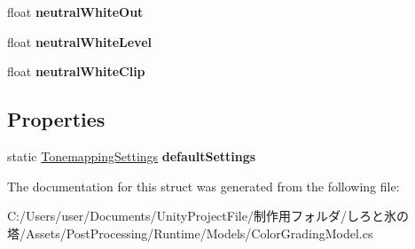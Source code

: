\begin{DoxyCompactItemize}
float {\bfseries neutral\+White\+Out}
\item 
\mbox{\label{struct_unity_engine_1_1_post_processing_1_1_color_grading_model_1_1_tonemapping_settings_a4f2e937233ddb0d540977b2ea1748137}} 
float {\bfseries neutral\+White\+Level}
\item 
\mbox{\label{struct_unity_engine_1_1_post_processing_1_1_color_grading_model_1_1_tonemapping_settings_a2433f12d9af67406a0117ea05e67f117}} 
float {\bfseries neutral\+White\+Clip}
\end{DoxyCompactItemize}
\subsection*{Properties}
\begin{DoxyCompactItemize}
\item 
\mbox{\label{struct_unity_engine_1_1_post_processing_1_1_color_grading_model_1_1_tonemapping_settings_afaaeaac01b5da1e740cf66a4e56abe7b}} 
static \hyperlink{struct_unity_engine_1_1_post_processing_1_1_color_grading_model_1_1_tonemapping_settings}{Tonemapping\+Settings} {\bfseries default\+Settings}
\end{DoxyCompactItemize}


The documentation for this struct was generated from the following file\+:\begin{DoxyCompactItemize}
\item 
C\+:/\+Users/user/\+Documents/\+Unity\+Project\+File/制作用フォルダ/しろと氷の塔/\+Assets/\+Post\+Processing/\+Runtime/\+Models/Color\+Grading\+Model.\+cs\end{DoxyCompactItemize}
